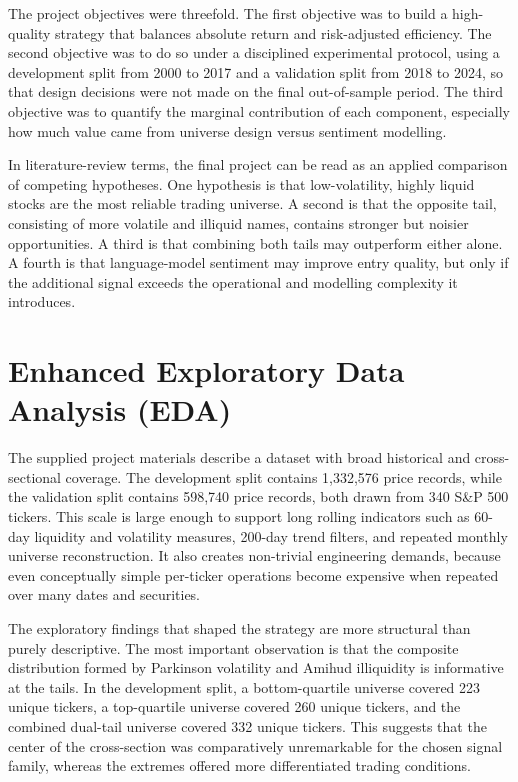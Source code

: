 \documentclass[11pt,twoside,a4paper]{article}
\begin{document}
The project objectives were threefold. The first objective was to build a high-quality strategy that balances absolute return and risk-adjusted efficiency. The second objective was to do so under a disciplined experimental protocol, using a development split from 2000 to 2017 and a validation split from 2018 to 2024, so that design decisions were not made on the final out-of-sample period. The third objective was to quantify the marginal contribution of each component, especially how much value came from universe design versus sentiment modelling.

In literature-review terms, the final project can be read as an applied comparison of competing hypotheses. One hypothesis is that low-volatility, highly liquid stocks are the most reliable trading universe. A second is that the opposite tail, consisting of more volatile and illiquid names, contains stronger but noisier opportunities. A third is that combining both tails may outperform either alone. A fourth is that language-model sentiment may improve entry quality, but only if the additional signal exceeds the operational and modelling complexity it introduces.

\section{Enhanced Exploratory Data Analysis (EDA)}
The supplied project materials describe a dataset with broad historical and cross-sectional coverage. The development split contains 1,332,576 price records, while the validation split contains 598,740 price records, both drawn from 340 S\&P 500 tickers. This scale is large enough to support long rolling indicators such as 60-day liquidity and volatility measures, 200-day trend filters, and repeated monthly universe reconstruction. It also creates non-trivial engineering demands, because even conceptually simple per-ticker operations become expensive when repeated over many dates and securities.

The exploratory findings that shaped the strategy are more structural than purely descriptive. The most important observation is that the composite distribution formed by Parkinson volatility and Amihud illiquidity is informative at the tails. In the development split, a bottom-quartile universe covered 223 unique tickers, a top-quartile universe covered 260 unique tickers, and the combined dual-tail universe covered 332 unique tickers. This suggests that the center of the cross-section was comparatively unremarkable for the chosen signal family, whereas the extremes offered more differentiated trading conditions.
\end{document}
